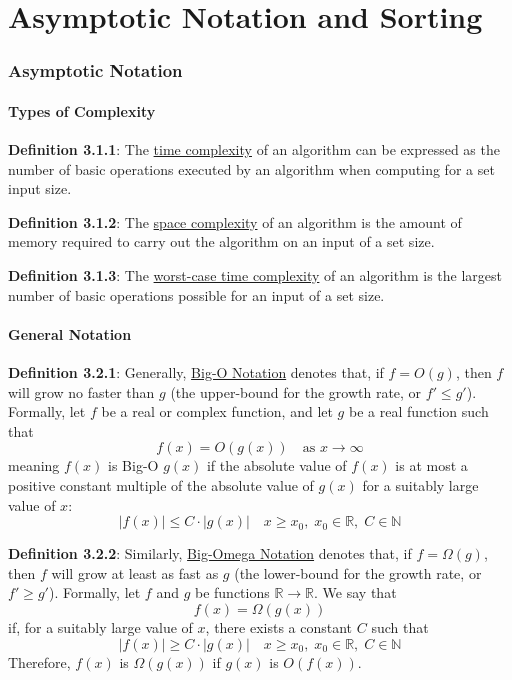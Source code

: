 \documentclass{article}
\newcommand{\separate}[1] {\vspace{#1 pt}\noindent}
\newcommand{\R}{\mathbb{R}}
\newcommand{\N}{\mathbb{N}}
\newcommand{\definition}[2]{\textbf{Definition #1}: #2\label{def:#1}}
\begin{document}
\newpage\part{Asymptotic Notation and Sorting}\label{part:2.ans}

\section{Asymptotic Notation}

\subsection{Types of Complexity}

\definition{3.1.1}{The \underline{time complexity} of an algorithm can be expressed as the number of basic operations executed by an algorithm when computing for a set input size.}

\separate{7}\definition{3.1.2}{The \underline{space complexity} of an algorithm is the amount of memory required to carry out the algorithm on an input of a set size.}

\separate{7}\definition{3.1.3}{The \underline{worst-case time complexity} of an algorithm is the largest number of basic operations possible for an input of a set size.}

\subsection{General Notation}

\definition{3.2.1}{Generally, \underline{Big-O Notation} denotes that, if \(f = O(g)\), then \(f\) will grow no faster than \(g\) (the upper-bound for the growth rate, or \(f' \leq g'\)).} Formally, let \(f\) be a real or complex function, and let \(g\) be a real function such that
\begin{equation}
    f(x) = O(g(x)) \quad\text{as } x \rightarrow \infty
\end{equation}
meaning \(f(x)\) is Big-O \(g(x)\) if the absolute value of \(f(x)\) is at most a positive constant multiple of the absolute value of \(g(x)\) for a suitably large value of \(x\):
\begin{equation}
    |f(x)| \leq C \cdot |g(x)| \quad x \geq x_0, \; x_0 \in \R, \; C \in \N
\end{equation}

\separate{7}\definition{3.2.2}{Similarly, \underline{Big-Omega Notation} denotes that, if \(f=\Omega(g)\), then \(f\) will grow at least as fast as \(g\) (the lower-bound for the growth rate, or \(f' \geq g'\)).} Formally, let \(f\) and \(g\) be functions \(\R \rightarrow \R\). We say that 
\begin{equation}
    f(x) = \Omega(g(x))
\end{equation}
if, for a suitably large value of \(x\), there exists a constant \(C\) such that
\begin{equation}
    |f(x)| \geq C \cdot |g(x)| \quad x \geq x_0, \; x_0 \in \R, \; C \in \N
\end{equation}
Therefore, \(f(x)\) is \(\Omega(g(x))\) if \(g(x)\) is \(O(f(x))\).
\end{document}
